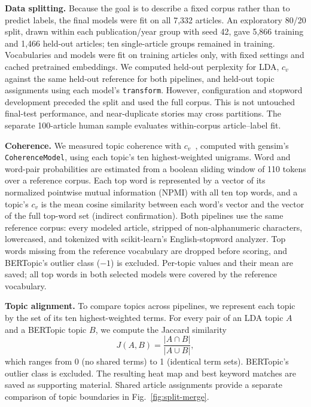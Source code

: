 \documentclass[conference]{IEEEtran}
\begin{document}
\textbf{Data splitting.} Because the goal is to describe a fixed corpus rather than to predict labels, the final models were fit on all 7,332 articles. An exploratory 80/20 split, drawn within each publication/year group with seed 42, gave 5,866 training and 1,466 held-out articles; ten single-article groups remained in training. Vocabularies and models were fit on training articles only, with fixed settings and cached pretrained embeddings. We computed held-out perplexity for LDA, $c_v$ against the same held-out reference for both pipelines, and held-out topic assignments using each model's \texttt{transform}. However, configuration and stopword development preceded the split and used the full corpus. This is not untouched final-test performance, and near-duplicate stories may cross partitions. The separate 100-article human sample evaluates within-corpus article--label fit.

\textbf{Coherence.} We measured topic coherence with $c_v$~\cite{roder2015coherence}, computed with gensim's \texttt{CoherenceModel}, using each topic's ten highest-weighted unigrams. Word and word-pair probabilities are estimated from a boolean sliding window of 110 tokens over a reference corpus. Each top word is represented by a vector of its normalized pointwise mutual information (NPMI) with all ten top words, and a topic's $c_v$ is the mean cosine similarity between each word's vector and the vector of the full top-word set (indirect confirmation). Both pipelines use the same reference corpus: every modeled article, stripped of non-alphanumeric characters, lowercased, and tokenized with scikit-learn's English-stopword analyzer. Top words missing from the reference vocabulary are dropped before scoring, and BERTopic's outlier class ($-1$) is excluded. Per-topic values and their mean are saved; all top words in both selected models were covered by the reference vocabulary.

\textbf{Topic alignment.} To compare topics across pipelines, we represent each topic by the set of its ten highest-weighted terms. For every pair of an LDA topic $A$ and a BERTopic topic $B$, we compute the Jaccard similarity
\begin{equation}
J(A,B) = \frac{|A\cap B|}{|A\cup B|},
\label{eq:jaccard}
\end{equation}
which ranges from 0 (no shared terms) to 1 (identical term sets). BERTopic's outlier class is excluded. The resulting heat map and best keyword matches are saved as supporting material. Shared article assignments provide a separate comparison of topic boundaries in Fig.~\ref{fig:split-merge}.
\end{document}
